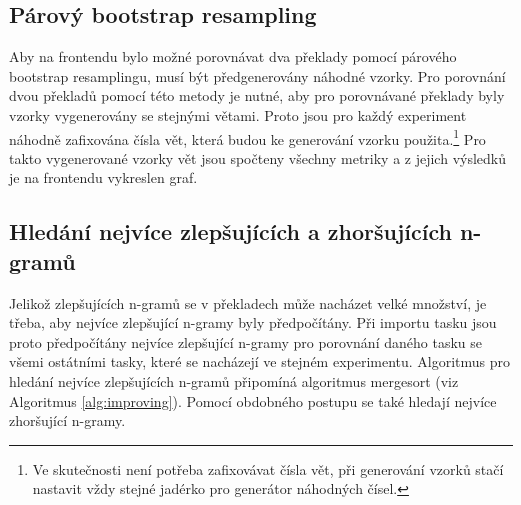 \subsection{Párový bootstrap resampling}
\label{chap:bootstrap-resampling}
Aby na frontendu bylo možné porovnávat dva překlady pomocí párového bootstrap resamplingu,
  musí být předgenerovány náhodné vzorky.
Pro porovnání dvou překladů pomocí této metody je nutné,
  aby pro porovnávané překlady byly vzorky vygenerovány se stejnými větami.
Proto jsou pro každý experiment náhodně zafixována čísla vět,
  která budou ke generování vzorku použita.\footnote{
	Ve skutečnosti není potřeba zafixovávat čísla vět,
	při generování vzorků stačí nastavit vždy stejné jadérko pro generátor náhodných čísel.
  }
Pro takto vygenerované vzorky vět jsou spočteny všechny metriky a
  z jejich výsledků je na frontendu vykreslen graf.

\subsection{Hledání nejvíce zlepšujících a zhoršujících \mbox{n-gramů}}
\label{chap:improving-worsening}
Jelikož zlepšujících \mbox{n-gramů} se v překladech může nacházet velké množství,
  je třeba, aby nejvíce zlepšující n-gramy byly předpočítány.
Při importu tasku jsou proto předpočítány nejvíce zlepšující \mbox{n-gramy} pro porovnání daného tasku se všemi ostátními tasky,
  které se nacházejí ve stejném experimentu.
Algoritmus pro hledání nejvíce zlepšujících \mbox{n-gramů} připomíná algoritmus mergesort (viz Algoritmus \ref{alg:improving}).
Pomocí obdobného postupu se také hledají nejvíce zhoršující \mbox{n-gramy}.

